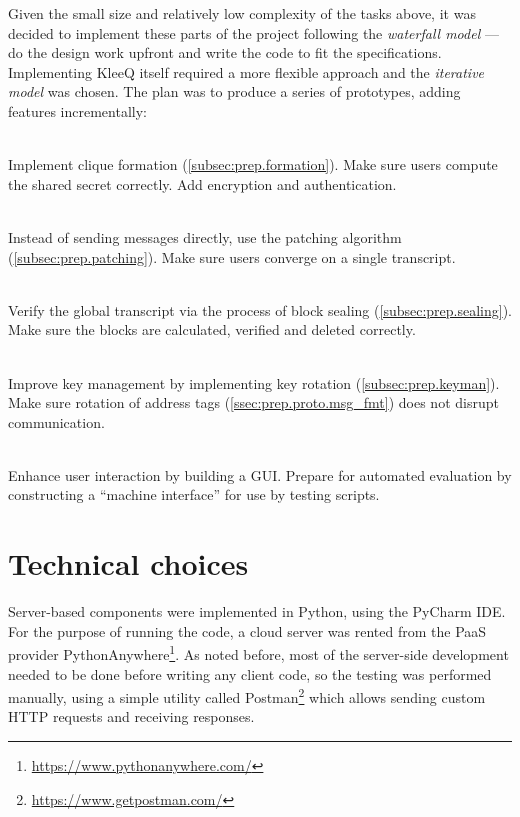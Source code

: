 \documentclass[a4paper, twoside, 12pt]{report}
\begin{document}
Given the small size and relatively low complexity of the tasks above, it was decided to implement these parts of the project following the \emph{waterfall model} --- do the design work upfront and write the code to fit the specifications. \\

Implementing KleeQ itself required a more flexible approach and the \emph{iterative model} was chosen. The plan was to produce a series of prototypes, adding features incrementally:
\begin{description}[labelindent=0.5cm, leftmargin=1.3cm, rightmargin=0.5cm]
    \item[Prototype 1: Clique Formation]\hfill \\
        Implement clique formation (\cref{subsec:prep.formation}). Make sure users compute the shared secret correctly. Add encryption and authentication.
    \item[Prototype 2: Patching]\hfill \\
        Instead of sending messages directly, use the patching algorithm (\cref{subsec:prep.patching}). Make sure users converge on a single transcript.
    \item[Prototype 3: Sealing]\hfill \\
        Verify the global transcript via the process of block sealing (\cref{subsec:prep.sealing}). Make sure the blocks are calculated, verified and deleted correctly.
    \item[Prototype 4: Key Management]\hfill \\
        Improve key management by implementing key rotation (\cref{subsec:prep.keyman}). Make sure rotation of address tags (\cref{ssec:prep.proto.msg_fmt}) does not disrupt communication.
    \item[Prototype 5: Interface] \hfill \\
        Enhance user interaction by building a GUI. Prepare for automated evaluation by constructing a ``machine interface'' for use by testing scripts. 
\end{description}

\section{Technical choices}
\label{sec:choices}
Server-based components were implemented in Python, using the PyCharm IDE. For the purpose of running the code, a cloud server was rented from the PaaS provider PythonAnywhere\footnote{\url{https://www.pythonanywhere.com/}}. As noted before, most of the server-side development needed to be done before writing any client code, so the testing was performed manually, using a simple utility called Postman\footnote{\url{https://www.getpostman.com/}} which allows sending custom HTTP requests and receiving responses. \\
\end{document}
